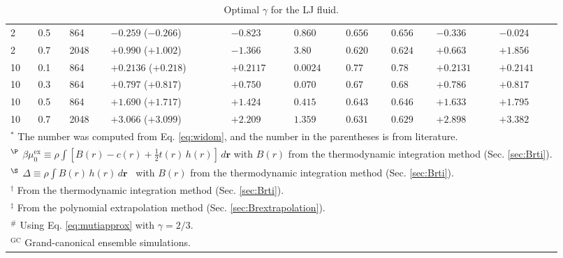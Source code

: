 \documentclass[preprint]{revtex4-1}
\newcommand{\vct}[1]{\mathbf{#1}}
\providecommand{\vr}{} %
\renewcommand{\vr}{\vct{r}}
\begin{document}
\begin{table*}
\begin{tabular}[c]{p{1cm} p{1.1cm} p{1.3cm} p{3cm} p{1.5cm} p{1.3cm} p{1.3cm} p{1.5cm}
    p{2.0cm} p{1.5cm}}
     2    &   0.5     &  864  &   $-0.259$ ($-0.266$)    & $-0.823$  &  $0.860$  &   $0.656$  &   $0.656$  &  $-0.336$ &  $-0.024$  \\
     2    &   0.7     &  2048 &   $+0.990$ ($+1.002$)    & $-1.366$  &  $3.80$   &   $0.620$  &   $0.624$  &  $+0.663$ &  $+1.856$  \\
    \hline
    10    &   0.1     &  864  &   $+0.2136$ ($+0.218$)   & $+0.2117$ &  $0.0024$ &   $0.77 $  &   $0.78 $  &  $+0.2131$&  $+0.2141$ \\
    10    &   0.3     &  864  &   $+0.797$ ($+0.817$)    & $+0.750$  &  $0.070$  &   $0.67 $  &   $0.68 $  &  $+0.786$ &  $+0.817$  \\
    10    &   0.5     &  864  &   $+1.690$ ($+1.717$)    & $+1.424$  &  $0.415$  &   $0.643$  &   $0.646$  &  $+1.633$ &  $+1.795$  \\
    10    &   0.7     &  2048 &   $+3.066$ ($+3.099$)    & $+2.209$  &  $1.359$  &   $0.631$  &   $0.629$  &  $+2.898$ &  $+3.382$  \\
    \hline
    \multicolumn{10}{l}{
      $^*$
      The number was computed from Eq. \eqref{eq:widom},
      and the number in the parentheses is from literature\cite{johnson1993}.
    }
    \\
    \multicolumn{10}{l}{
      $^\P$
      $\beta \mu_0^\mathrm{ex} \equiv \rho \int [B(r) - c(r) + \frac{1}{2} t(r) \, h(r)] \, d\vr$
      with $B(r)$ from the thermodynamic integration method
      (Sec. \ref{sec:Brti}).
    }
    \\
    \multicolumn{10}{l}{
      $^\S$
      $\Delta \equiv \rho \int B(r) \, h(r) \, d\vr$ \
      with $B(r)$ from the thermodynamic integration method
      (Sec. \ref{sec:Brti}).
    }
    \\
    \multicolumn{10}{l}{
      $^\dagger$
      From the thermodynamic integration method
      (Sec. \ref{sec:Brti}).
    }
    \\
    \multicolumn{10}{l}{
      $^\ddagger$
      From the polynomial extrapolation method
      (Sec. \ref{sec:Brextrapolation}).
    }
    \\
    \multicolumn{10}{l}{
      $^\#$
      Using Eq. \eqref{eq:mutiapprox} with $\gamma = 2/3$.
    }
    \\
    \multicolumn{10}{l}{
      $^\mathrm{GC}$
      Grand-canonical ensemble simulations.
    }
    \\
    \hline
  \end{tabular}
  \caption{\label{tab:results}Optimal $\gamma$ for the LJ fluid.}
\end{table*}
\end{document}
